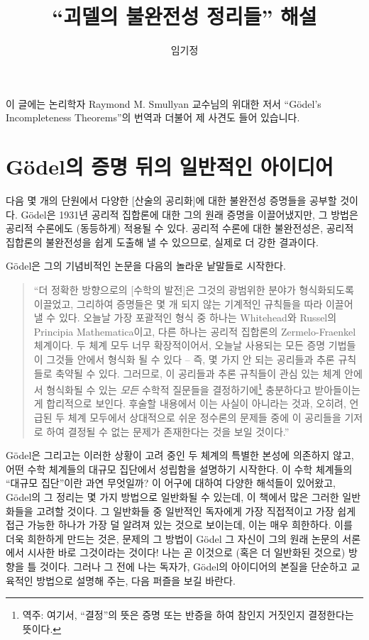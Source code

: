 \documentclass[12pt]{paper}
\title{``괴델의 불완전성 정리들'' 해설}
\author{임기정}
\begin{document}
  \maketitle

  이 글에는 논리학자 Raymond M. Smullyan 교수님의 위대한 저서 ``G\"odel's Incompleteness Theorems''의 번역과 더불어 제 사견도 들어 있습니다.

  \section{G\"odel의 증명 뒤의 일반적인 아이디어}
  \hspace{12pt}

  다음 몇 개의 단원에서 다양한 [산술의 공리화]에 대한 불완전성 증명들을 공부할 것이다.
  G\"odel은 1931년 공리적 집합론에 대한 그의 원래 증명을 이끌어냈지만,
  그 방법은 공리적 수론에도 (동등하게) 적용될 수 있다.
  공리적 수론에 대한 불완전성은,
  공리적 집합론의 불완전성을 쉽게 도출해 낼 수 있으므로,
  실제로 더 강한 결과이다.
  
  G\"odel은 그의 기념비적인 논문을 다음의 놀라운 낱말들로 시작한다.

  \begin{quotation}
    ``더 정확한 방향으로의 [수학의 발전]은 그것의 광범위한 분야가 형식화되도록 이끌었고,
    그리하여 증명들은 몇 개 되지 않는 기계적인 규칙들을 따라 이끌어 낼 수 있다.
    오늘날 가장 포괄적인 형식 중 하나는 Whitehead와 Russel의 Principia Mathematica이고,
    다른 하나는 공리적 집합론의 Zermelo-Fraenkel 체계이다.
    두 체계 모두 너무 확장적이어서,
    오늘날 사용되는 모든 증명 기법들이 그것들 안에서 형식화 될 수 있다 --
    즉, 몇 가지 안 되는 공리들과 추론 규칙들로 축약될 수 있다.
    그러므로, 이 공리들과 추론 규칙들이 관심 있는 체계 안에서 형식화될 수 있는 \textit{모든} 수학적 질문들을 결정하기에\footnote
    {
      역주: 여기서, ``결정''의 뜻은 증명 또는 반증을 하여 참인지 거짓인지 결정한다는 뜻이다.
    }
    충분하다고 받아들이는 게 합리적으로 보인다.
    후술할 내용에서 이는 사실이 아니라는 것과,
    오히려, 언급된 두 체계 모두에서 상대적으로 쉬운 정수론의 문제들 중에 이 공리들을 기저로 하여 결정될 수 없는 문제가 존재한다는 것을 보일 것이다.''
  \end{quotation}

  G\"odel은 그리고는 이러한 상황이 고려 중인 두 체계의 특별한 본성에 의존하지 않고,
  어떤 수학 체계들의 대규모 집단에서 성립함을 설명하기 시작한다.
  이 수학 체계들의 ``대규모 집단''이란 과연 무엇일까?
  이 어구에 대하여 다양한 해석들이 있어왔고,
  G\"odel의 그 정리는 몇 가지 방법으로 일반화될 수 있는데,
  이 책에서 많은 그러한 일반화들을 고려할 것이다.
  그 일반화들 중 일반적인 독자에게 가장 직접적이고 가장 쉽게 접근 가능한 하나가 가장 덜 알려져 있는 것으로 보이는데,
  이는 매우 희한하다.
  이를 더욱 희한하게 만드는 것은,
  문제의 그 방법이 G\"odel 그 자신이 그의 원래 논문의 서론에서 시사한 바로 그것이라는 것이다!
  나는 곧 이것으로 (혹은 더 일반화된 것으로) 방향을 틀 것이다.
  그러나 그 전에 나는 독자가,
  G\"odel의 아이디어의 본질을 단순하고 교육적인 방법으로 설명해 주는,
  다음 퍼즐을 보길 바란다.
\end{document}
